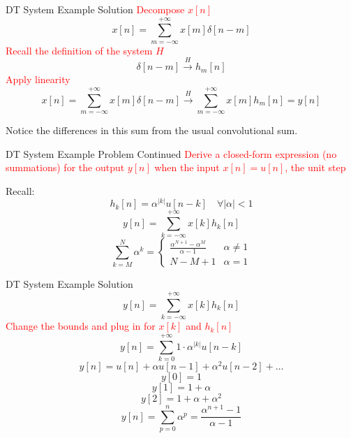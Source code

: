\begin{frame}{DT System Example Solution}
    \textcolor{red}{Decompose $x[n]$}
    \[x[n] = \sum_{m=-\infty}^{+\infty}x[m]\delta[n-m]\]
    \textcolor{red}{Recall the definition of the system $H$}
    \[\delta[n-m] \overset{H}{\longrightarrow} h_m[n]\]
    \textcolor{red}{Apply linearity}
    \[x[n] = \sum_{m=-\infty}^{+\infty}x[m]\delta[n-m] \overset{H}{\longrightarrow} \sum_{m=-\infty}^{+\infty}x[m]h_m[n] = y[n]\]
    
    Notice the differences in this sum from the usual convolutional sum.
\end{frame}

\begin{frame}{DT System Example Problem Continued}
    \textcolor{red}{Derive a closed-form expression (no summations) for the output $y[n]$ when the input $x[n] = u[n]$, the unit step}
    
    Recall:
    \[h_k[n] = \alpha^{|k|}u[n-k] \quad \forall |\alpha| < 1\]
    \[y[n] = \sum_{k=-\infty}^{+\infty}x[k]h_k[n]\]
    \[\sum_{k=M}^N \alpha^k = 
        \begin{cases}
            \frac{\alpha^{N+1}-\alpha^M}{\alpha-1} & \alpha\ne 1 \\
            N-M+1 & \alpha= 1
        \end{cases}
    \]
\end{frame}

\begin{frame}{DT System Example Solution}
    \[y[n] = \sum_{k=-\infty}^{+\infty}x[k]h_k[n]\]
    \textcolor{red}{Change the bounds and plug in for $x[k]$ and $h_k[n]$}
    \[y[n] = \sum_{k=0}^{+\infty}1\cdot \alpha^{|k|}u[n-k]\]
    \[y[n] = u[n] + \alpha u[n-1] + \alpha^2 u[n-2] + \dots\]
    \[y[0] = 1\]
    \[y[1] = 1+\alpha\]
    \[y[2] = 1+\alpha+\alpha^2\]
    \[y[n] = \sum_{p=0}^n \alpha^p = \frac{\alpha^{n+1}-1}{\alpha -1}\]
    
\end{frame}
